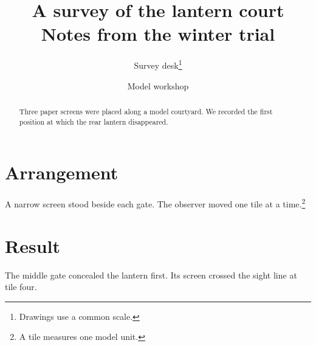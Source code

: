 \documentclass{article}
\begin{document}
\title{A survey of the lantern court\\[3pt]{\large Notes from the winter trial}}
\author{Survey desk\thanks{Drawings use a common scale.} \and Model workshop}
\date{}\maketitle
\begin{abstract}Three paper screens were placed along a model courtyard. We recorded the first position at which the rear lantern disappeared.\end{abstract}
\section{Arrangement}A narrow screen stood beside each gate. The observer moved one tile at a time.\footnote{A tile measures one model unit.}
\section{Result}The middle gate concealed the lantern first. Its screen crossed the sight line at tile four.
\end{document}
